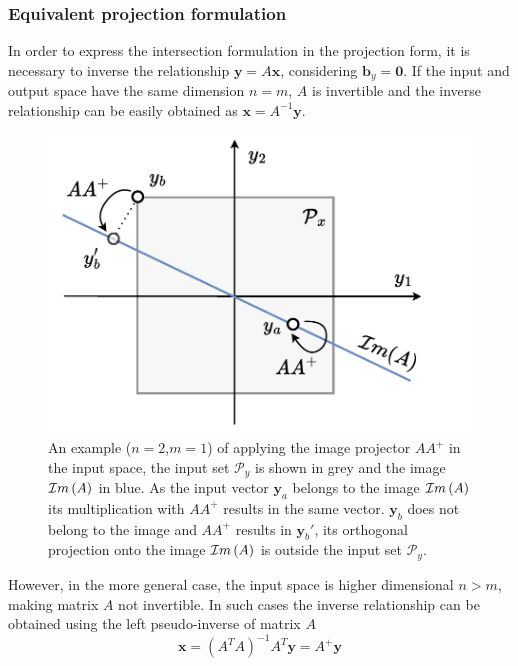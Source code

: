 \subsubsection*{Equivalent projection formulation}\label{par:equivalent_proj} In order to express the intersection formulation in the projection form, it is necessary to inverse the relationship $\bm{y}=A\bm{x}$, considering $\bm{b}_y=\bm{0}$. If the input and output space have the same dimension $n=m$, $A$ is invertible and the inverse relationship can be easily obtained as $\bm{x} = A^{-1}\bm{y}$. 

\begin{figure}
\vspace{-0.5cm}
    \centering
    \includegraphics[width=\linewidth]{Chapters/imgs/img_pseudo_prob.pdf}
    \caption{An example ($n=2$,$m=1$) of applying the image projector $AA^+$ in the input space, the input set $\mathcal{P}_y$ is shown in grey and the image $\mathcal{I}m\left(A\right)$ in blue. As the input vector $\bm{y}_a$ belongs to the image $\mathcal{I}m\left(A\right)$ its multiplication with $AA^+$ results in the same vector. $\bm{y}_b$  does not belong to the image and $AA^+$ results in $\bm{y}_b'$, its orthogonal projection onto the image $\mathcal{I}m\left(A\right)$ is outside the input set $\mathcal{P}_y$.}
    \label{fig:image_psueodinverse_ilustration}
\end{figure}

However, in the more general case, the input space is higher dimensional $n>m$, making  matrix $A$ not invertible. In such cases the inverse relationship can be obtained using the left pseudo-inverse of matrix $A$
\begin{equation}
    \bm{x} = (A^TA)^{-1}A^T\bm{y} = A^+\bm{y}
    \label{eq:pseudoinverse_equation}
\end{equation}


